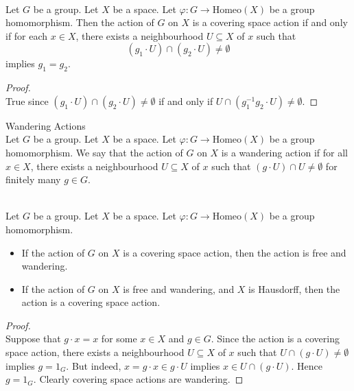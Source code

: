 \documentclass[a4paper]{article}
\begin{document}
\begin{lmm}{}{}\\
Let $G$ be a group. Let $X$ be a space. Let $\varphi:G\to\text{Homeo}(X)$ be a group homomorphism. Then the action of $G$ on $X$ is a covering space action if and only if for each $x\in X$, there exists a neighbourhood $U\subseteq X$ of $x$ such that $$(g_1\cdot U)\cap(g_2\cdot U)\neq\emptyset$$ implies $g_1=g_2$. 
\begin{proof}\\
True since $(g_1\cdot U)\cap(g_2\cdot U)\neq\emptyset$ if and only if $U\cap(g_1^{-1}g_2\cdot U)\neq\emptyset$. 
\end{proof}
\end{lmm}

\begin{defn}{Wandering Actions}{}\\
Let $G$ be a group. Let $X$ be a space. Let $\varphi:G\to\text{Homeo}(X)$ be a group homomorphism. We say that the action of $G$ on $X$ is a wandering action if for all $x\in X$, there exists a neighbourhood $U\subseteq X$ of $x$ such that $(g\cdot U)\cap U\neq\emptyset$ for finitely many $g\in G$. 
\end{defn}

\begin{prp}{}{}\\
Let $G$ be a group. Let $X$ be a space. Let $\varphi:G\to\text{Homeo}(X)$ be a group homomorphism. 
\begin{itemize}
\item If the action of $G$ on $X$ is a covering space action, then the action is free and wandering. 
\item If the action of $G$ on $X$ is free and wandering, and $X$ is Hausdorff, then the action is a covering space action. 
\end{itemize}
\begin{proof}\\
Suppose that $g\cdot x=x$ for some $x\in X$ and $g\in G$. Since the action is a covering space action, there exists a neighbourhood $U\subseteq X$ of $x$ such that $U\cap(g\cdot U)\neq\emptyset$ implies $g=1_G$. But indeed, $x=g\cdot x\in g\cdot U$ implies $x\in U\cap(g\cdot U)$. Hence $g=1_G$. Clearly covering space actions are wandering. 
\end{proof}
\end{prp}
\end{document}

